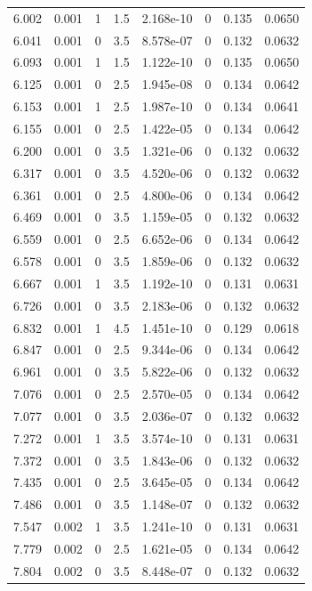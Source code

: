 \documentclass[preview]{standalone}
\begin{document}
{{{\begin{tabular}{L{1.2cm}C{1.2cm} C{0.3cm}C{0.5cm} C{1.4cm}C{1.4cm} C{1.4cm}C{1.4cm}}
  6.002  &  0.001  & 1     & 1.5 &  2.168e-10  & 0  & 0.135 &  0.0650   \\ 
  6.041  &  0.001  & 0     & 3.5 &  8.578e-07  & 0  & 0.132 &  0.0632   \\ 
  6.093  &  0.001  & 1     & 1.5 &  1.122e-10  & 0  & 0.135 &  0.0650   \\ 
  6.125  &  0.001  & 0     & 2.5 &  1.945e-08  & 0  & 0.134 &  0.0642   \\ 
  6.153  &  0.001  & 1     & 2.5 &  1.987e-10  & 0  & 0.134 &  0.0641   \\ 
  6.155  &  0.001  & 0     & 2.5 &  1.422e-05  & 0  & 0.134 &  0.0642   \\ 
  6.200  &  0.001  & 0     & 3.5 &  1.321e-06  & 0  & 0.132 &  0.0632   \\ 
  6.317  &  0.001  & 0     & 3.5 &  4.520e-06  & 0  & 0.132 &  0.0632   \\ 
  6.361  &  0.001  & 0     & 2.5 &  4.800e-06  & 0  & 0.134 &  0.0642   \\ 
  6.469  &  0.001  & 0     & 3.5 &  1.159e-05  & 0  & 0.132 &  0.0632   \\ 
  6.559  &  0.001  & 0     & 2.5 &  6.652e-06  & 0  & 0.134 &  0.0642   \\ 
  6.578  &  0.001  & 0     & 3.5 &  1.859e-06  & 0  & 0.132 &  0.0632   \\ 
  6.667  &  0.001  & 1     & 3.5 &  1.192e-10  & 0  & 0.131 &  0.0631   \\ 
  6.726  &  0.001  & 0     & 3.5 &  2.183e-06  & 0  & 0.132 &  0.0632   \\ 
  6.832  &  0.001  & 1     & 4.5 &  1.451e-10  & 0  & 0.129 &  0.0618   \\ 
  6.847  &  0.001  & 0     & 2.5 &  9.344e-06  & 0  & 0.134 &  0.0642   \\ 
  6.961  &  0.001  & 0     & 3.5 &  5.822e-06  & 0  & 0.132 &  0.0632   \\ 
  7.076  &  0.001  & 0     & 2.5 &  2.570e-05  & 0  & 0.134 &  0.0642   \\ 
  7.077  &  0.001  & 0     & 3.5 &  2.036e-07  & 0  & 0.132 &  0.0632   \\ 
  7.272  &  0.001  & 1     & 3.5 &  3.574e-10  & 0  & 0.131 &  0.0631   \\ 
  7.372  &  0.001  & 0     & 3.5 &  1.843e-06  & 0  & 0.132 &  0.0632   \\ 
  7.435  &  0.001  & 0     & 2.5 &  3.645e-05  & 0  & 0.134 &  0.0642   \\ 
  7.486  &  0.001  & 0     & 3.5 &  1.148e-07  & 0  & 0.132 &  0.0632   \\ 
  7.547  &  0.002  & 1     & 3.5 &  1.241e-10  & 0  & 0.131 &  0.0631   \\ 
  7.779  &  0.002  & 0     & 2.5 &  1.621e-05  & 0  & 0.134 &  0.0642   \\ 
  7.804  &  0.002  & 0     & 3.5 &  8.448e-07  & 0  & 0.132 &  0.0632   \\ 
\hline 
\end{tabular} 

}}}
\end{document}
